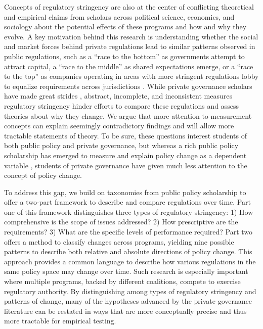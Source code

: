 \documentclass[
      12pt,
            Review ]{article}
\begin{document}
Concepts of regulatory stringency are also at the center of conflicting
theoretical and empirical claims from scholars across political science,
economics, and sociology about the potential effects of these programs
and how and why they evolve. A key motivation behind this research is
understanding whether the social and market forces behind private
regulations lead to similar patterns observed in public regulations,
such as a ``race to the bottom'' as governments attempt to attract
capital, a ``race to the middle'' as shared expectations emerge, or a
``race to the top'' as companies operating in areas with more stringent
regulations lobby to equalize requirements across jurisdictions
\citep{Berger1996, Rodrik2004, Vogel1995}. While private governance
scholars have made great strides \citep{Grabs2018}, abstract,
incomplete, and inconsistent measures regulatory stringency hinder
efforts to compare these regulations and assess theories about why they
change. We argue that more attention to measurement concepts can explain
seemingly contradictory findings and will allow more tractable
statements of theory. To be sure, these questions interest students of
both public policy and private governance, but whereas a rich public
policy scholarship has emerged to measure and explain policy change as a
dependent variable \citep{Green-Pedersen2007, Hall1993, Howlett2014},
students of private governance have given much less attention to the
concept of policy change.

To address this gap, we build on taxonomies from public policy
scholarship to offer a two-part framework to describe and compare
regulations over time. Part one of this framework distinguishes three
types of regulatory stringency: 1) How comprehensive is the scope of
issues addressed? 2) How prescriptive are the requirements? 3) What are
the specific levels of performance required? Part two offers a method to
classify changes across programs, yielding nine possible patterns to
describe both relative and absolute directions of policy change. This
approach provides a common language to describe how various regulations
in the same policy space may change over time. Such research is
especially important where multiple programs, backed by different
coalitions, compete to exercise regulatory authority. By distinguishing
among types of regulatory stringency and patterns of change, many of the
hypotheses advanced by the private governance literature can be restated
in ways that are more conceptually precise and thus more tractable for
empirical testing.
\end{document}
